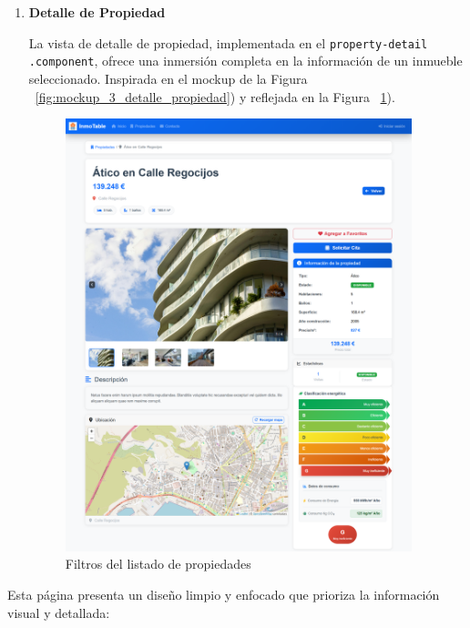 \begin{enumerate}
\begin{enumerate}
        \item \textbf{Detalle de Propiedad}

        La vista de detalle de propiedad, implementada en el \texttt{property-detail} \\ \texttt{.component}, ofrece una inmersión completa en la información de un inmueble seleccionado. Inspirada en el mockup de la Figura ~\ref{fig:mockup_3_detalle_propiedad}) y reflejada en la Figura ~\ref{fig:detallepropiedades}).
        
        \begin{figure}[H]
            \begin{center}
                \includegraphics[width = 0.95\textwidth]{Figuras/detallepropiedades.png}
            \end{center}
            \caption{\label{fig:detallepropiedades} Filtros del listado de propiedades}
        \end{figure}

    \end{enumerate}

    Esta página presenta un diseño limpio y enfocado que prioriza la información visual y detallada:


\end{enumerate}
